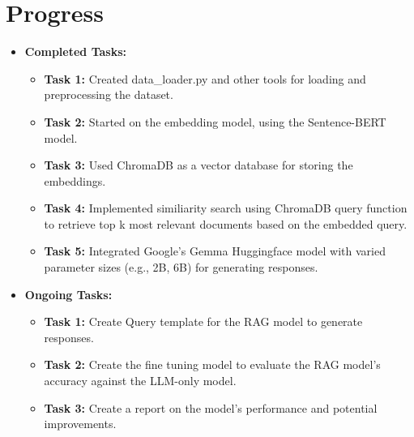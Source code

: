 \documentclass[12pt]{article}
\begin{document}
\section*{Progress}
\begin{itemize}
    \item \textbf{Completed Tasks:}
    \begin{itemize}[leftmargin=*]
        \item \textbf{Task 1:} Created data\_loader.py and other tools for loading and preprocessing the dataset.
        \item \textbf{Task 2:} Started on the embedding model, using the Sentence-BERT model.
        \item \textbf{Task 3:} Used ChromaDB as a vector database for storing the embeddings.
        \item \textbf{Task 4:} Implemented similiarity search using ChromaDB query function to retrieve top k most relevant documents based on the embedded query.
        \item \textbf{Task 5:} Integrated Google's Gemma Huggingface model with varied parameter sizes (e.g., 2B, 6B) for generating responses.
    \end{itemize}
    \item \textbf{Ongoing Tasks:}
    \begin{itemize}[leftmargin=*]
        \item \textbf{Task 1:} Create Query template for the RAG model to generate responses.
        \item \textbf{Task 2:} Create the fine tuning model to evaluate the RAG model's accuracy against the LLM-only model.
        \item \textbf{Task 3:} Create a report on the model's performance and potential improvements.
    \end{itemize}
\end{itemize}
\end{document}

